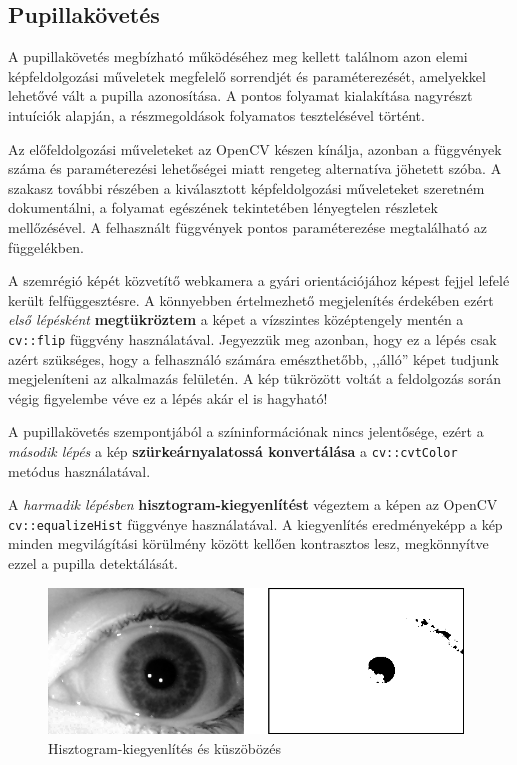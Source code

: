 \subsection{Pupillakövetés}\label{sect:pupillakov}

A pupillakövetés megbízható működéséhez meg kellett találnom azon elemi képfeldolgozási műveletek megfelelő sorrendjét és paraméterezését, amelyekkel lehetővé vált a pupilla azonosítása. A pontos folyamat kialakítása nagyrészt intuíciók alapján, a részmegoldások folyamatos tesztelésével történt.

Az előfeldolgozási műveleteket az OpenCV készen kínálja, azonban a függvények száma és paraméterezési lehetőségei miatt rengeteg alternatíva jöhetett szóba. A szakasz további részében a kiválasztott képfeldolgozási műveleteket szeretném dokumentálni, a folyamat egészének tekintetében lényegtelen részletek mellőzésével. A felhasznált függvények pontos paraméterezése megtalálható az  függelékben.

\bigskip

A szemrégió képét közvetítő webkamera a gyári orientációjához képest fejjel lefelé került felfüggesztésre. A könnyebben értelmezhető megjelenítés érdekében ezért \emph{első lépésként} \textbf{megtükröztem} a képet a vízszintes középtengely mentén a \texttt{cv::flip} függvény használatával. Jegyezzük meg azonban, hogy ez a lépés csak azért szükséges, hogy a felhasználó számára emészthetőbb, ,,álló'' képet tudjunk megjeleníteni az alkalmazás felületén. A kép tükrözött voltát a feldolgozás során végig figyelembe véve ez a lépés akár el is hagyható!

A pupillakövetés szempontjából a színinformációnak nincs jelentősége, ezért a \emph{második lépés} a kép \textbf{szürkeárnyalatossá konvertálása} a \texttt{cv::cvtColor} metódus használatával.

A \emph{harmadik lépésben} \textbf{hisztogram-kiegyenlítést} végeztem a képen az OpenCV \texttt{cv::equalizeHist} függvénye használatával. A kiegyenlítés eredményeképp a kép minden megvilágítási körülmény között kellően kontrasztos lesz, megkönnyítve ezzel a pupilla detektálását.

\begin{figure}[!ht]
\centering
\includegraphics[width=110mm, keepaspectratio]{figures/eq_thresh.png}
\caption{Hisztogram-kiegyenlítés és küszöbözés}
\label{fig:eq_thresh}
\end{figure}

